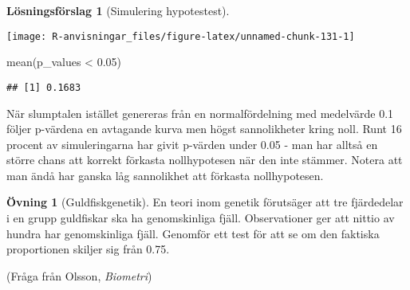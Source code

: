 \documentclass[
]{book}
\newenvironment{Shaded}{\begin{snugshade}}{\end{snugshade}}
\newcommand{\AttributeTok}[1]{\textcolor[rgb]{0.77,0.63,0.00}{#1}}
\newcommand{\ControlFlowTok}[1]{\textcolor[rgb]{0.13,0.29,0.53}{\textbf{#1}}}
\newcommand{\DecValTok}[1]{\textcolor[rgb]{0.00,0.00,0.81}{#1}}
\newcommand{\FloatTok}[1]{\textcolor[rgb]{0.00,0.00,0.81}{#1}}
\newcommand{\FunctionTok}[1]{\textcolor[rgb]{0.00,0.00,0.00}{#1}}
\newcommand{\NormalTok}[1]{#1}
\newcommand{\OtherTok}[1]{\textcolor[rgb]{0.56,0.35,0.01}{#1}}
\newcommand{\SpecialCharTok}[1]{\textcolor[rgb]{0.00,0.00,0.00}{#1}}
\theoremstyle{definition}
\theoremstyle{definition}
\theoremstyle{definition}
\newtheorem{exercise}{Övning}[chapter]
\theoremstyle{definition}
\newtheorem{hypothesis}{Lösningsförslag}[chapter]
\theoremstyle{remark}
\begin{document}
\begin{hypothesis}[Simulering hypotestest]
\begin{Shaded}
\end{Shaded}

\begin{center}\texttt{[image: R-anvisningar\_files/figure-latex/unnamed-chunk-131-1]} \end{center}

\begin{Shaded}
\begin{Highlighting}[]
\FunctionTok{mean}\NormalTok{(p\_values }\SpecialCharTok{\textless{}} \FloatTok{0.05}\NormalTok{)}
\end{Highlighting}
\end{Shaded}

\begin{verbatim}
## [1] 0.1683
\end{verbatim}

När slumptalen istället genereras från en normalfördelning med medelvärde 0.1 följer p-värdena en avtagande kurva men högst sannolikheter kring noll. Runt 16 procent av simuleringarna har givit p-värden under 0.05 - man har alltså en större chans att korrekt förkasta nollhypotesen när den inte stämmer. Notera att man ändå har ganska låg sannolikhet att förkasta nollhypotesen.
\end{hypothesis}

\begin{exercise}[Guldfiskgenetik]
En teori inom genetik förutsäger att tre fjärdedelar i en grupp guldfiskar ska ha genomskinliga fjäll. Observationer ger att nittio av hundra har genomskinliga fjäll. Genomför ett test för att se om den faktiska proportionen skiljer sig från 0.75.

(Fråga från Olsson, \emph{Biometri})
\end{exercise}
\end{document}
